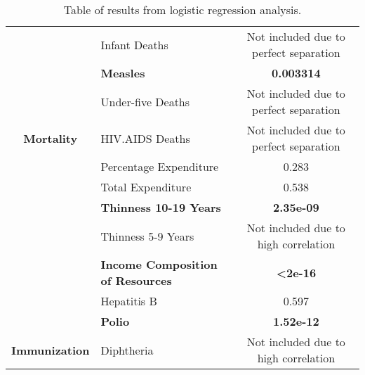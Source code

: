 \begin{table}[h!]
{\begin{tabular}{|c|l|c|}
\cellcolor[HTML]{D9D9D9}                                              & Infant Deaths                                                   & Not included due to perfect separation            \\ \cline{2-3} 
\cellcolor[HTML]{D9D9D9}                                              & \textbf{Measles}                                                & \textbf{0.003314}                                 \\ \cline{2-3} 
\cellcolor[HTML]{D9D9D9}                                              & Under-five Deaths                                               & Not included due to perfect separation            \\ \cline{2-3} 
\multirow{-5}{*}{\cellcolor[HTML]{D9D9D9}\textbf{Mortality}}          & HIV.AIDS Deaths                                                 & Not included due to perfect separation            \\ \hline
\rowcolor[HTML]{EFEFEF} 
\cellcolor[HTML]{D9D9D9}                                              & Percentage Expenditure                                          & 0.283                                             \\ \cline{2-3} 
\rowcolor[HTML]{EFEFEF} 
\cellcolor[HTML]{D9D9D9}                                              & Total Expenditure                                               & 0.538                                             \\ \cline{2-3} 
\rowcolor[HTML]{EFEFEF} 
\cellcolor[HTML]{D9D9D9}                                              & \textbf{Thinness 10-19 Years}                                   & \textbf{2.35e-09}                                 \\ \cline{2-3} 
\rowcolor[HTML]{EFEFEF} 
\cellcolor[HTML]{D9D9D9}                                              & Thinness 5-9 Years                                              & Not included due to high correlation              \\ \cline{2-3} 
\rowcolor[HTML]{EFEFEF} 
\multirow{-5}{*}{\cellcolor[HTML]{D9D9D9}\textbf{Health Development}} & \textbf{Income Composition of Resources}                        & \textbf{\textless 2e-16}                          \\ \hline
\cellcolor[HTML]{D9D9D9}                                              & Hepatitis B                                                     & 0.597                                             \\ \cline{2-3} 
\cellcolor[HTML]{D9D9D9}                                              & \textbf{Polio}                                                  & \textbf{1.52e-12}                                 \\ \cline{2-3} 
\multirow{-3}{*}{\cellcolor[HTML]{D9D9D9}\textbf{Immunization}}       & Diphtheria                                                      & Not included due to high correlation              \\ \hline
\end{tabular}%
}
\caption{Table of results from logistic regression analysis.}
\label{tab:table_2}
\end{table}